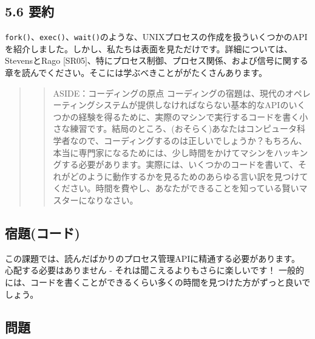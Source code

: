 \hypertarget{ux8981ux7d04}{%
\subsection*{5.6 要約}\label{ux8981ux7d04}}

\texttt{fork()}、\texttt{exec()}、\texttt{wait()}のような、UNIXプロセスの作成を扱ういくつかのAPIを紹介しました。しかし、私たちは表面を見ただけです。詳細については、StevensとRago
{[}SR05{]}、特にプロセス制御、プロセス関係、および信号に関する章を読んでください。そこには学ぶべきことががたくさんあります。

\begin{quote}
\begin{quote}
ASIDE：コーディングの原点
コーディングの宿題は、現代のオペレーティングシステムが提供しなければならない基本的なAPIのいくつかの経験を得るために、実際のマシンで実行するコードを書く小さな練習です。結局のところ、(おそらく)あなたはコンピュータ科学者なので、コーディングするのは正しいでしょうか？もちろん、本当に専門家になるためには、少し時間をかけてマシンをハッキングする必要があります。実際には、いくつかのコードを書いて、それがどのように動作するかを見るためのあらゆる言い訳を見つけてください。時間を費やし、あなたができることを知っている賢いマスターになりなさい。
\end{quote}
\end{quote}

\hypertarget{ux5bbfux984cux30b3ux30fcux30c9}{%
\subsection*{宿題(コード)}\label{ux5bbfux984cux30b3ux30fcux30c9}}

この課題では、読んだばかりのプロセス管理APIに精通する必要があります。
心配する必要はありません - それは聞こえるよりもさらに楽しいです！
一般的には、コードを書くことができるくらい多くの時間を見つけた方がずっと良いでしょう。

\hypertarget{ux554fux984c}{%
\subsection*{問題}\label{ux554fux984c}}

